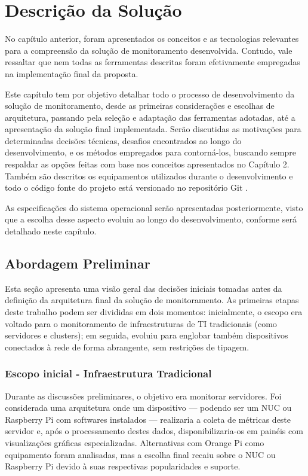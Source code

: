 \chapter{Descrição da Solução}
\label{chap3}

No capítulo anterior, foram apresentados os conceitos e as tecnologias relevantes para a compreensão da solução de monitoramento desenvolvida. Contudo, vale ressaltar que nem todas as ferramentas descritas foram efetivamente empregadas na implementação final da proposta.

Este capítulo tem por objetivo detalhar todo o processo de desenvolvimento da solução de monitoramento, desde as primeiras considerações e escolhas de arquitetura, passando pela seleção e adaptação das ferramentas adotadas, até a apresentação da solução final implementada. Serão discutidas as motivações para determinadas decisões técnicas, desafios encontrados ao longo do desenvolvimento, e os métodos empregados para contorná-los, buscando sempre respaldar as opções feitas com base nos conceitos apresentados no Capítulo 2. Também são descritos os equipamentos utilizados durante o desenvolvimento e todo o código fonte do projeto está versionado no repositório Git \citep{vitorcossetti2025}.

As especificações do sistema operacional serão apresentadas posteriormente, visto que a escolha desse aspecto evoluiu ao longo do desenvolvimento, conforme será detalhado neste capítulo.

\section{Abordagem Preliminar}
\label{section:AbordagemPreliminar}

Esta seção apresenta uma visão geral das decisões iniciais tomadas antes da definição da arquitetura final da solução de monitoramento. As primeiras etapas deste trabalho podem ser divididas em dois momentos: inicialmente, o escopo era voltado para o monitoramento de infraestruturas de TI tradicionais (como servidores e clusters); em seguida, evoluiu para englobar também dispositivos conectados à rede de forma abrangente, sem restrições de tipagem.

\subsection{Escopo inicial - Infraestrutura Tradicional}
\label{subsection:EscopoInicial}

Durante as discussões preliminares, o objetivo era monitorar servidores. Foi considerada uma arquitetura onde um dispositivo --- podendo ser um NUC ou Raspberry Pi com softwares instalados --- realizaria a coleta de métricas deste servidor e, após o processamento destes dados, disponibilizaria-os em painéis com visualizações gráficas especializadas. Alternativas com Orange Pi como equipamento foram analisadas, mas a escolha final recaiu sobre o NUC ou Raspberry Pi devido à suas respectivas popularidades e suporte.


